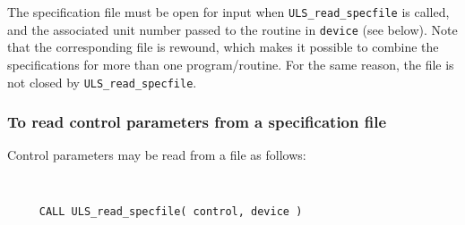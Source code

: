 \documentclass{galahad}
\newcommand{\packagename}{ULS}
\begin{document}
The specification file must be open for
input when {\tt \packagename\_read\_specfile}
is called, and the associated unit number
passed to the routine in {\tt device} (see below).
Note that the corresponding
file is rewound, which makes it possible to combine the specifications
for more than one program/routine.  For the same reason, the file is not
closed by {\tt \packagename\_read\_specfile}.

\subsubsection{To read control parameters from a specification file}
\label{readspec}

Control parameters may be read from a file as follows:
\hskip0.5in

\def\baselinestretch{0.8}
{\tt
\begin{verbatim}
     CALL ULS_read_specfile( control, device )
\end{verbatim}
}
\def\baselinestretch{1.0}
\end{document}
